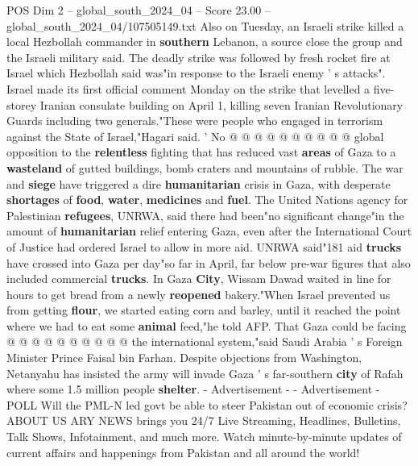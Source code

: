 \begin{textsample}{POS Dim 2 – global\_south\_2024\_04 – Score 23.00 – global\_south\_2024\_04/107505149.txt}
Also on Tuesday, an Israeli strike killed a local Hezbollah commander in \textbf{southern} Lebanon, a source close the group and the Israeli military said.
The deadly strike was followed by fresh rocket fire at Israel which Hezbollah said was"in response to the Israeli enemy ' s attacks".
Israel made its first official comment Monday on the strike that levelled a five-storey Iranian consulate building on April 1, killing seven Iranian Revolutionary Guards including two generals."These were people who engaged in terrorism against the State of Israel,"Hagari said. ' No @ @ @ @ @ @ @ @ @ @ global opposition to the \textbf{relentless} fighting that has reduced vast \textbf{areas} of Gaza to a \textbf{wasteland} of gutted buildings, bomb craters and mountains of rubble.
The war and \textbf{siege} have triggered a dire \textbf{humanitarian} crisis in Gaza, with desperate \textbf{shortages} of \textbf{food}, \textbf{water}, \textbf{medicines} and \textbf{fuel}.
The United Nations agency for Palestinian \textbf{refugees}, UNRWA, said there had been"no significant change"in the amount of \textbf{humanitarian} relief entering Gaza, even after the International Court of Justice had ordered Israel to allow in more aid.
UNRWA said"181 aid \textbf{trucks} have crossed into Gaza per day"so far in April, far below pre-war figures that also included commercial \textbf{trucks}.
In Gaza \textbf{City}, Wissam Dawad waited in line for hours to get bread from a newly \textbf{reopened} bakery."When Israel prevented us from getting \textbf{flour}, we started eating corn and barley, until it reached the point where we had to eat some \textbf{animal} feed,"he told AFP.
That Gaza could be facing @ @ @ @ @ @ @ @ @ @ the international system,"said Saudi Arabia ' s Foreign Minister Prince Faisal bin Farhan.
Despite objections from Washington, Netanyahu has insisted the army will invade Gaza ' s far-southern \textbf{city} of Rafah where some 1.5 million people \textbf{shelter}. - Advertisement - - Advertisement - POLL Will the PML-N led govt be able to steer Pakistan out of economic crisis?
ABOUT US ARY NEWS brings you 24/7 Live Streaming, Headlines, Bulletins, Talk Shows, Infotainment, and much more.
Watch minute-by-minute updates of current affairs and happenings from Pakistan and all around the world!

\end{textsample}
